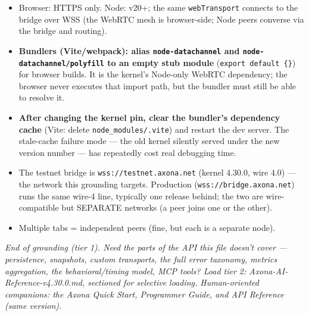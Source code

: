 \documentclass[
  nobib]{tufte-handout}
\providecommand{\tightlist}{%
  \setlength{\itemsep}{0pt}\setlength{\parskip}{0pt}}
\begin{document}
\begin{itemize}
\tightlist
\item
  Browser: HTTPS only. Node: v20+; the same \texttt{webTransport}
  connects to the bridge over WSS (the WebRTC mesh is browser-side; Node
  peers converse via the bridge and routing).
\item
  \textbf{Bundlers (Vite/webpack): alias \texttt{node-datachannel} and
  \texttt{node-datachannel/polyfill} to an empty stub module}
  (\texttt{export\ default\ \{\}}) for browser builds. It is the
  kernel's Node-only WebRTC dependency; the browser never executes that
  import path, but the bundler must still be able to resolve it.
\item
  \textbf{After changing the kernel pin, clear the bundler's dependency
  cache} (Vite: delete \texttt{node\_modules/.vite}) and restart the dev
  server. The stale-cache failure mode --- the old kernel silently
  served under the new version number --- has repeatedly cost real
  debugging time.
\item
  The testnet bridge is \texttt{wss://testnet.axona.net} (kernel 4.30.0,
  wire 4.0) --- the network this grounding targets. Production
  (\texttt{wss://bridge.axona.net}) runs the same wire-4 line, typically
  one release behind; the two are wire-compatible but SEPARATE networks
  (a peer joins one or the other).
\item
  Multiple tabs = independent peers (fine, but each is a separate node).
\end{itemize}

\emph{End of grounding (tier 1). Need the parts of the API this file
doesn't cover — persistence, snapshots, custom transports, the full error
taxonomy, metrics aggregation, the behavioral/timing model, MCP tools?
Load tier 2: Axona-AI-Reference-v4.30.0.md, sectioned for selective
loading. Human-oriented companions: the Axona Quick Start, Programmer
Guide, and API Reference (same version).}
\end{document}
